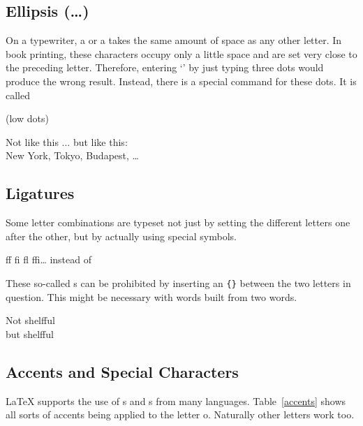 \subsection{Ellipsis (\texorpdfstring{\ldots}{...})}

On a typewriter, a  or a  takes the same amount of
space as any other letter. In book printing, these characters occupy
only a little space and are set very close to the preceding letter.
Therefore, entering `' by just typing three
dots would produce the wrong result. Instead, there is a special
command for these dots. It is called

\begin{lscommand}
 (low dots)
\end{lscommand}


\begin{example}
Not like this ... but like this:\\
New York, Tokyo, Budapest, \ldots
\end{example}
 
\subsection{Ligatures}

Some letter combinations are typeset not just by setting the
different letters one after the other, but by actually using special
symbols.
\begin{code}
{\large ff fi fl ffi\ldots}\quad
instead of
\end{code}
These so-called s can be prohibited by inserting an \verb|{}|
between the two letters in question. This might be necessary with
words built from two words.

\begin{example}
\Large Not shelfful\\
but shelf\mbox{}ful
\end{example}
 
\subsection{Accents and Special Characters}
 
\LaTeX{} supports the use of s and s
from many languages. Table~\ref{accents} shows all sorts of accents
being applied to the letter o. Naturally other letters work too.

